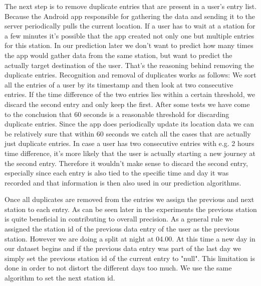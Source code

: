 The next step is to remove duplicate entries that are present in a user's entry list. Because the Android app responsible for gathering the data and sending it to the server periodically pulls the current location. If a user has to wait at a station for a few minutes it's possible that the app created not only one but multiple entries for this station. In our prediction later we don't want to predict how many times the app would gather data from the same station, but want to predict the actually target destination of the user. That's the reasoning behind removing the duplicate entries. Recognition and removal of duplicates works as follows: We sort all the entries of a user by its timestamp and then look at two consecutive entries. If the time difference of the two entries lies within a certain threshold, we discard the second entry and only keep the first. After some tests we have come to the conclusion that 60 seconds is a reasonable threshold for discarding duplicate entries. Since the app does periodically update its location data we can be relatively sure that within 60 seconds we catch all the cases that are actually just duplicate entries. In case a user has two consecutive entries with e.g. 2 hours time difference, it's more likely that the user is actually starting a new journey at the second entry. Therefore it wouldn't make sense to discard the second entry, especially since each entry is also tied to the specific time and day it was recorded and that information is then also used in our prediction algorithms.

Once all duplicates are removed from the entries we assign the previous and next station to each entry. As can be seen later in the experiments the previous station is quite beneficial in contributing to overall precision. As a general rule we assigned the station id of the previous data entry of the user as the previous station. However we are doing a split at night at 04.00. At this time a new day in our dataset begins and if the previous data entry was part of the last day we simply set the previous station id of the current entry to "null". This limitation is done in order to not distort the different days too much. We use the same algorithm to set the next station id.

